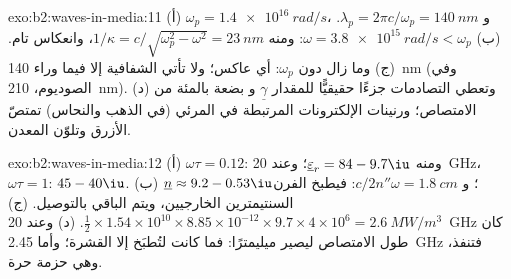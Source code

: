 \begin{solution}{exo:b2:waves-in-media:11}
(أ) $\omega_p = \qty{1.4e16}{rad/s}$، و $\lambda_p = 2\pi c/\omega_p = \qty{140}{nm}$. (ب) $\omega = \qty{3.8e15}{rad/s}
< \omega_p$: ومنه $1/\kappa = c/\sqrt{\omega_p^2 - \omega^2} = \qty{23}{nm}$، وانعكاس تام. (ج)
وما زال دون $\omega_p$: أي عاكس؛ ولا تأتي الشفافية إلا فيما وراء \qty{140}{nm} (وفي
الصوديوم، \qty{210}{nm}). (د) وتعطي التصادمات جزءًا حقيقيًّا للمقدار $\underline\gamma$ و
بضعة بالمئة من الامتصاص؛ ورنينات الإلكترونات المرتبطة في المرئي
(في الذهب والنحاس) تمتصّ الأزرق وتلوّن المعدن.
\end{solution}

\begin{solution}{exo:b2:waves-in-media:12}
(أ) $\omega\tau = 0.12$: ومنه $\underline\varepsilon_r = 84 - 9.7\iu$؛ وعند \qty{20}{GHz}، $\omega\tau = 1$:
$45 - 40\iu$. (ب) $\underline n \approx 9.2 - 0.53\iu$؛ و $c/2n''\omega = \qty{1.8}{cm}$: فيطبخ الفرن
السنتيمترين الخارجيين، ويتم الباقي بالتوصيل. (ج) $\tfrac12 \times
1.54 \times 10^{10} \times 8.85 \times 10^{-12} \times 9.7 \times 4 \times 10^6 = \qty{2.6}{MW/m^3}$. (د) وعند
\qty{20}{GHz} كان طول الامتصاص ليصير ميليمترًا: فما كانت لتُطبَخ إلا
القشرة؛ وأما \qty{2.45}{GHz} فتنفذ، وهي حزمة حرة.
\end{solution}

